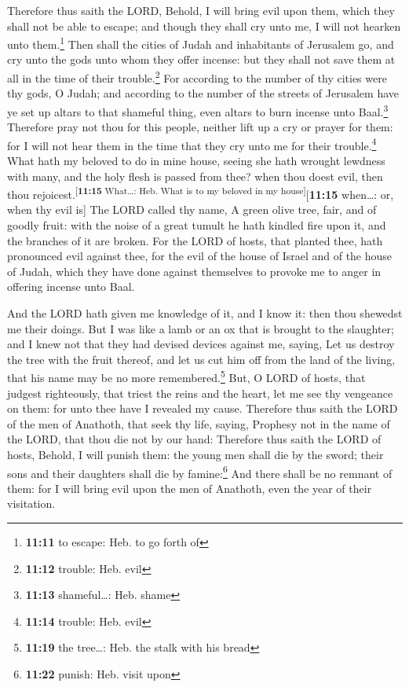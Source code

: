  Therefore thus saith the LORD, Behold, I will bring evil
upon them, which they shall not be able to escape; and though they shall
cry unto me, I will not hearken unto them.\footnote{\textbf{11:11} to
  escape: Heb. to go forth of}  Then shall the cities of
Judah and inhabitants of Jerusalem go, and cry unto the gods unto whom
they offer incense: but they shall not save them at all in the time of
their trouble.\footnote{\textbf{11:12} trouble: Heb. evil}
 For according to the number of thy cities were thy gods,
O Judah; and according to the number of the streets of Jerusalem have ye
set up altars to that shameful thing, even altars to burn incense unto
Baal.\footnote{\textbf{11:13} shameful\ldots: Heb. shame}
 Therefore pray not thou for this people, neither lift up
a cry or prayer for them: for I will not hear them in the time that they
cry unto me for their trouble.\footnote{\textbf{11:14} trouble: Heb.
  evil}  What hath my beloved to do in mine house, seeing
she hath wrought lewdness with many, and the holy flesh is passed from
thee? when thou doest evil, then thou
rejoicest.\textsuperscript{{[}\textbf{11:15} What\ldots: Heb. What is to
my beloved in my house{]}}{[}\textbf{11:15} when\ldots: or, when thy
evil is{]}  The LORD called thy name, A green olive tree,
fair, and of goodly fruit: with the noise of a great tumult he hath
kindled fire upon it, and the branches of it are broken. 
For the LORD of hosts, that planted thee, hath pronounced evil against
thee, for the evil of the house of Israel and of the house of Judah,
which they have done against themselves to provoke me to anger in
offering incense unto Baal.

 And the LORD hath given me knowledge of it, and I know
it: then thou shewedst me their doings.  But I was like a
lamb or an ox that is brought to the slaughter; and I knew not that they
had devised devices against me, saying, Let us destroy the tree with the
fruit thereof, and let us cut him off from the land of the living, that
his name may be no more remembered.\footnote{\textbf{11:19} the
  tree\ldots: Heb. the stalk with his bread}  But, O LORD
of hosts, that judgest righteously, that triest the reins and the heart,
let me see thy vengeance on them: for unto thee have I revealed my
cause.  Therefore thus saith the LORD of the men of
Anathoth, that seek thy life, saying, Prophesy not in the name of the
LORD, that thou die not by our hand:  Therefore thus
saith the LORD of hosts, Behold, I will punish them: the young men shall
die by the sword; their sons and their daughters shall die by
famine:\footnote{\textbf{11:22} punish: Heb. visit upon} 
And there shall be no remnant of them: for I will bring evil upon the
men of Anathoth, even the year of their visitation.

